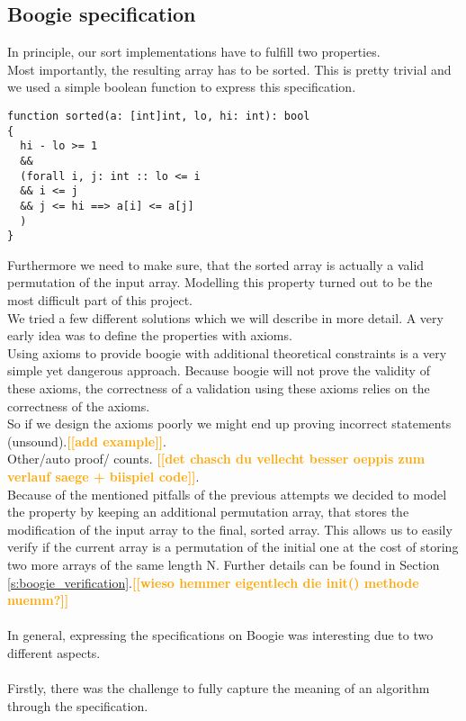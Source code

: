\documentclass{report}
\newcommand{\todo}[1]{\textsf{\textbf{\textcolor{orange}{[[#1]]}}}}
\begin{document}
\subsection{Boogie specification}
In principle, our sort implementations have to fulfill two properties.\\
Most importantly, the resulting array has to be sorted. This is pretty trivial and we used
a simple boolean function to express this specification.
\begin{lstlisting}
function sorted(a: [int]int, lo, hi: int): bool
{
  hi - lo >= 1
  &&
  (forall i, j: int :: lo <= i 
  && i <= j 
  && j <= hi ==> a[i] <= a[j]
  )
}
\end{lstlisting}
Furthermore we need to make sure, that the sorted array is actually a valid
permutation of the input array. Modelling this property turned out to be the most difficult part
of this project.\\
We tried a few different solutions which we will describe in more detail.
A very early idea was to define the properties with axioms.\\ 
Using axioms to provide boogie with additional theoretical constraints is a very simple yet dangerous approach. Because boogie will not prove the validity of these axioms, the correctness of a validation using these axioms relies on the correctness of the axioms.\\
So if we design the axioms poorly we might end up proving incorrect statements (unsound).\todo{add example}.\\
Other/auto proof/ counts. \todo{det chasch du vellecht besser oeppis zum verlauf saege + biispiel code}.\\
Because of the mentioned pitfalls of the previous attempts we decided to model the property by keeping an additional permutation array, that stores the modification of the input array to the final, sorted array. This allows us to easily verify if the current array is a permutation of the initial one at the cost of storing two more arrays of the same length N. Further details can be found in Section \ref{s:boogie_verification}.\todo{wieso hemmer eigentlech die init() methode nuemm?}
\\\\
In general, expressing the specifications on Boogie was interesting due to two different aspects.
\\
\\
Firstly, there was the challenge to fully capture the meaning of an algorithm
through the specification.\\
\end{document}

